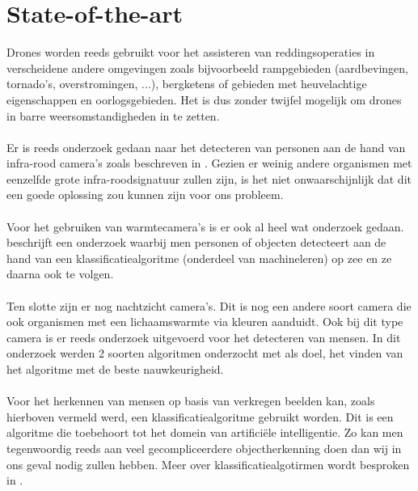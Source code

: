 
\section{State-of-the-art}
\label{sec:state-of-the-art}

Drones worden reeds gebruikt voor het assisteren van reddingsoperaties in verscheidene andere omgevingen zoals bijvoorbeeld rampgebieden (aardbevingen, tornado's, overstromingen, ...)\autocite{DronesAndDisaster}, bergketens of gebieden met heuvelachtige eigenschappen \autocite{Mountains} en oorlogsgebieden. Het is dus zonder twijfel mogelijk om drones in barre weersomstandigheden in te zetten.\\\\
Er is reeds onderzoek gedaan naar het detecteren van personen aan de hand van infra-rood camera's zoals beschreven in \autocite{IR}. Gezien er weinig andere organismen met eenzelfde grote infra-roodsignatuur zullen zijn, is het niet onwaarschijnlijk dat dit een goede oplossing zou kunnen zijn voor ons probleem.\\\\
Voor het gebruiken van warmtecamera's is er ook al heel wat onderzoek gedaan. \autocite{Heat} beschrijft een onderzoek waarbij men personen of objecten detecteert aan de hand van een klassificatiealgoritme (onderdeel van machineleren) op zee en ze daarna ook te volgen.\\\\ Ten slotte zijn er nog nachtzicht camera's. Dit is nog een andere soort camera die ook organismen met een lichaamswarmte via kleuren aanduidt. Ook bij dit type camera is er reeds onderzoek uitgevoerd voor het detecteren van mensen. In dit onderzoek werden 2 soorten algoritmen onderzocht met als doel, het vinden van het algoritme met de beste nauwkeurigheid. \autocite{Night}\\\\
Voor het herkennen van mensen op basis van verkregen beelden kan, zoals hierboven vermeld werd, een klassificatiealgoritme gebruikt worden. Dit is een algoritme die toebehoort tot het domein van artificiële intelligentie. Zo kan men tegenwoordig reeds aan veel gecompliceerdere objectherkenning doen dan wij in ons geval nodig zullen hebben. Meer over klassificatiealgotirmen wordt besproken in \autocite{Classification}.



